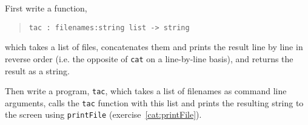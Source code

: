 First write a function,
\begin{quote}
  \mbox{\lstinline!tac : filenames:string list -> string!}
\end{quote}
which takes a list of files, concatenates them and prints the result
line by line in reverse order (i.e. the opposite of \lstinline{cat} on a
line-by-line basis), and returns the result as a string.

Then write a program, \lstinline[language=console]{tac}, which takes a
list of filenames as command line arguments, calls the \lstinline{tac}
function with this list and prints the resulting string to the screen
using \lstinline{printFile} (exercise~\ref{cat:printFile}).
